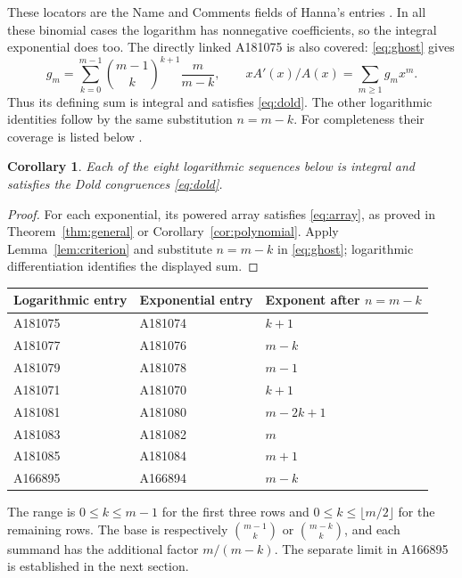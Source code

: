 \documentclass[11pt]{article}
\newtheorem{corollary}[theorem]{Corollary}
\begin{document}
These locators are the Name and Comments fields of Hanna's entries
\cite{h74,h70,h76,h78,h80,h82,h84,h166}. In all these binomial cases the
logarithm has nonnegative coefficients, so the integral exponential does too.
The directly linked A181075 is also covered: \eqref{eq:ghost} gives
\begin{equation}\label{eq:log}
 g_m=\sum_{k=0}^{m-1}\binom{m-1}{k}^{k+1}\frac{m}{m-k},
 \qquad xA'(x)/A(x)=\sum_{m\ge1}g_mx^m.
\end{equation}
Thus its defining sum is integral and satisfies \eqref{eq:dold}.
The other logarithmic identities follow by the same substitution $n=m-k$.
For completeness their coverage is listed below \cite{logs}.
\begin{corollary}\label{cor:logs}
Each of the eight logarithmic sequences below is integral and satisfies
the Dold congruences \eqref{eq:dold}.
\end{corollary}
\begin{proof}
For each exponential, its powered array satisfies \eqref{eq:array}, as
proved in Theorem~\ref{thm:general} or Corollary~\ref{cor:polynomial}.
Apply Lemma~\ref{lem:criterion} and substitute $n=m-k$ in
\eqref{eq:ghost}; logarithmic differentiation identifies the displayed sum.
\end{proof}
\begin{center}\small
\begin{tabular}{@{}lll@{}}
\toprule
Logarithmic entry & Exponential entry & Exponent after $n=m-k$\\
\midrule
A181075 & A181074 & $k+1$\\
A181077 & A181076 & $m-k$\\
A181079 & A181078 & $m-1$\\
A181071 & A181070 & $k+1$\\
A181081 & A181080 & $m-2k+1$\\
A181083 & A181082 & $m$\\
A181085 & A181084 & $m+1$\\
A166895 & A166894 & $m-k$\\
\bottomrule
\end{tabular}
\end{center}
The range is $0\le k\le m-1$ for the first three rows and
$0\le k\le\lfloor m/2\rfloor$ for the remaining rows.
The base is respectively $\binom{m-1}{k}$ or $\binom{m-k}{k}$,
and each summand has the additional factor $m/(m-k)$.
The separate limit in A166895 is established in the next section.
\end{document}
